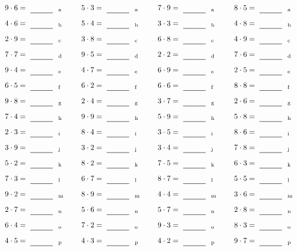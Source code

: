 \documentclass
[
  draft    = true,
  fontsize = 11pt,
  parskip  = half-
]
{scrartcl}
\begin{document}
\par\vfill\par
\begin{align*}
    \pline{9\cdot6}&=\rline{a}
  & \pline{5\cdot3}&=\rline{a}
  & \pline{7\cdot9}&=\rline{a}
  & \pline{8\cdot5}&=\rline{a} \\[1ex]
    \pline{4\cdot6}&=\rline{b}
  & \pline{5\cdot4}&=\rline{b}
  & \pline{3\cdot3}&=\rline{b}
  & \pline{4\cdot8}&=\rline{b} \\[1ex]
    \pline{2\cdot9}&=\rline{c}
  & \pline{3\cdot8}&=\rline{c}
  & \pline{6\cdot8}&=\rline{c}
  & \pline{4\cdot9}&=\rline{c} \\[1ex]
    \pline{7\cdot7}&=\rline{d}
  & \pline{9\cdot5}&=\rline{d}
  & \pline{2\cdot2}&=\rline{d}
  & \pline{7\cdot6}&=\rline{d} \\[1ex]
    \pline{9\cdot4}&=\rline{e}
  & \pline{4\cdot7}&=\rline{e}
  & \pline{6\cdot9}&=\rline{e}
  & \pline{2\cdot5}&=\rline{e} \\[1ex]
    \pline{6\cdot5}&=\rline{f}
  & \pline{6\cdot2}&=\rline{f}
  & \pline{6\cdot6}&=\rline{f}
  & \pline{8\cdot8}&=\rline{f} \\[1ex]
    \pline{9\cdot8}&=\rline{g}
  & \pline{2\cdot4}&=\rline{g}
  & \pline{3\cdot7}&=\rline{g}
  & \pline{2\cdot6}&=\rline{g} \\[1ex]
    \pline{7\cdot4}&=\rline{h}
  & \pline{9\cdot9}&=\rline{h}
  & \pline{5\cdot9}&=\rline{h}
  & \pline{5\cdot8}&=\rline{h} \\[1ex]
    \pline{2\cdot3}&=\rline{i}
  & \pline{8\cdot4}&=\rline{i}
  & \pline{3\cdot5}&=\rline{i}
  & \pline{8\cdot6}&=\rline{i} \\[1ex]
    \pline{3\cdot9}&=\rline{j}
  & \pline{3\cdot2}&=\rline{j}
  & \pline{3\cdot4}&=\rline{j}
  & \pline{7\cdot8}&=\rline{j} \\[1ex]
    \pline{5\cdot2}&=\rline{k}
  & \pline{8\cdot2}&=\rline{k}
  & \pline{7\cdot5}&=\rline{k}
  & \pline{6\cdot3}&=\rline{k} \\[1ex]
    \pline{7\cdot3}&=\rline{l}
  & \pline{6\cdot7}&=\rline{l}
  & \pline{8\cdot7}&=\rline{l}
  & \pline{5\cdot5}&=\rline{l} \\[1ex]
    \pline{9\cdot2}&=\rline{m}
  & \pline{8\cdot9}&=\rline{m}
  & \pline{4\cdot4}&=\rline{m}
  & \pline{3\cdot6}&=\rline{m} \\[1ex]
    \pline{2\cdot7}&=\rline{n}
  & \pline{5\cdot6}&=\rline{n}
  & \pline{5\cdot7}&=\rline{n}
  & \pline{2\cdot8}&=\rline{n} \\[1ex]
    \pline{6\cdot4}&=\rline{o}
  & \pline{7\cdot2}&=\rline{o}
  & \pline{9\cdot3}&=\rline{o}
  & \pline{8\cdot3}&=\rline{o} \\[1ex]
    \pline{4\cdot5}&=\rline{p}
  & \pline{4\cdot3}&=\rline{p}
  & \pline{4\cdot2}&=\rline{p}
  & \pline{9\cdot7}&=\rline{p}
\end{align*}
\end{document}
